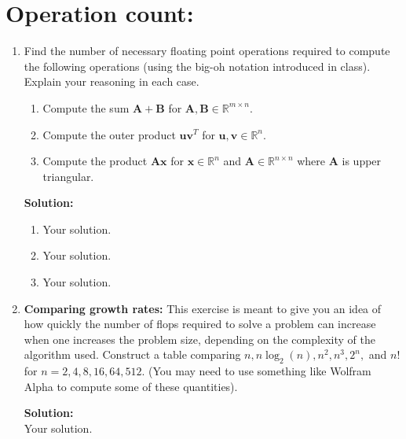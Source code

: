 \documentclass[]{article}
\newcommand{\R}{\mathbb{R}}				%
\newcommand{\x}{\bm{x}}					%
\newcommand{\A}{\bm{A}}					%
\newcommand{\solution}{\vskip 0.5cm \textbf{\large Solution:} \\}
\begin{document}
\section*{Operation count:}
\begin{enumerate}[resume]
	\item Find the number of necessary floating point operations required to compute the following operations (using the big-oh notation introduced in class). Explain your reasoning in each case.
	\begin{enumerate}
		\item Compute the sum $\A+\bm{B}$ for $\A,\bm{B}\in\R^{m\times n}$.
		\item Compute the outer product $\bm{uv}^T$ for $\bm{u},\bm{v}\in\R^n$.
		\item Compute the product $\A\x$ for $\x\in\R^n$ and $\A\in\R^{n\times n}$ where $\A$ is upper triangular.
	\end{enumerate}

	\solution
	\begin{enumerate}
		\item Your solution.
		\item Your solution.
		\item Your solution.
	\end{enumerate}


	\item \textbf{Comparing growth rates:} This exercise is meant to give you an idea of how quickly the number of flops required to solve a problem can increase when one increases the problem size, depending on the complexity of the algorithm used. Construct a table comparing $n,n\log_2(n),n^2,n^3,2^n,$ and $n!$ for $n=2,4,8,16,64,512$. (You may need to use something like Wolfram Alpha to compute some of these quantities).

	\solution Your solution.

\end{enumerate}
\end{document}
